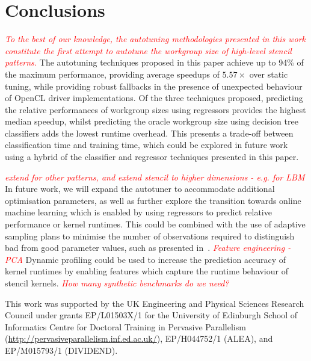 \documentclass[preprint,nonatbib,10pt,nocopyrightspace]{sigplanconf}
\newcommand{\fix}[1]{\textcolor{red}{\em\footnotesize#1}}
\begin{document}
\section{Conclusions}\label{sec:conclusions}

\fix{To the best of our knowledge, the autotuning methodologies
  presented in this work constitute the first attempt to autotune the
  workgroup size of high-level stencil patterns.} The autotuning
techniques proposed in this paper achieve up to 94\% of the maximum
performance, providing average speedups of $5.57\times$ over static
tuning, while providing robust fallbacks in the presence of unexpected
behaviour of OpenCL driver implementations. Of the three techniques
proposed, predicting the relative performances of workgroup sizes
using regressors provides the highest median speedup, whilst
predicting the oracle workgroup size using decision tree classifiers
adds the lowest runtime overhead. This presents a trade-off between
classification time and training time, which could be explored in
future work using a hybrid of the classifier and regressor techniques
presented in this paper.

\fix{extend for other patterns, and extend stencil to higher
  dimensions - e.g. for LBM} In future work, we will expand the
autotuner to accommodate additional optimisation parameters, as well
as further explore the transition towards online machine learning
which is enabled by using regressors to predict relative performance
or kernel runtimes. This could be combined with the use of adaptive
sampling plans to minimise the number of observations required to
distinguish bad from good parameter values, such as presented
in~\cite{Leather2009}. \fix{Feature engineering - PCA} Dynamic
profiling could be used to increase the prediction accuracy of kernel
runtimes by enabling features which capture the runtime behaviour of
stencil kernels. \fix{How many synthetic benchmarks do we need?}


\acks

This work was supported by the UK Engineering and Physical Sciences
Research Council under grants EP/L01503X/1 for the University of
Edinburgh School of Informatics Centre for Doctoral Training in
Pervasive Parallelism
(\url{http://pervasiveparallelism.inf.ed.ac.uk/}), EP/H044752/1
(ALEA), and EP/M015793/1 (DIVIDEND).


\label{bibliography}
\printbibliography
\end{document}
